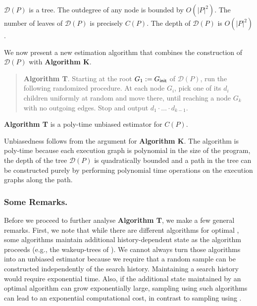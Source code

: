 

\begin{proposition}\label{prop:trust-size}
$\mathcal{D}(P)$ is a tree.
The outdegree of any node is bounded by $O(|P|^2)$.
The number of leaves of $\mathcal{D}(P)$ is precisely $C(P)$.
The depth of $\mathcal{D}(P)$ is $O(|P|^2)$.
\end{proposition}

We now present a new estimation algorithm that combines the construction of $\mathcal{D}(P)$ with \textbf{Algorithm K}.

\begin{verse}
\textbf{Algorithm T}. 
Starting at the root $G_1 := G_{\mathsf{init}}$ of $\mathcal{D}(P)$, run the following
randomized procedure.
At each node $G_i$, pick one of its $d_i$ children
uniformly at random and move there, until reaching a node $G_k$ with
no outgoing edges.
Stop and output $d_1\cdot\ldots\cdot d_{k-1}$.
\end{verse}

\begin{proposition}
\textbf{Algorithm T} is a poly-time unbiased estimator for $C(P)$.
\end{proposition}

Unbiasedness follows from the argument for \textbf{Algorithm K}.
The algorithm is poly-time because each execution graph is polynomial in the size of the program,
the depth of the tree $\mathcal{D}(P)$ is quadratically 
bounded and a path in the tree can be constructed purely by performing polynomial time operations
on the execution graphs along the path.



\subsubsection*{Some Remarks.} Before we proceed to further analyse \textbf{Algorithm T}, we make a few general remarks. First, we note that while there are different algorithms for optimal \dpor,  some algorithms maintain additional history-dependent state as the algorithm proceeds 
(e.g., the wakeup-trees of \cite{optimal-dpor}).
We cannot always turn those algorithms into an unbiased estimator because we require that a random sample can be constructed independently of the search history.
Maintaining a search history would require exponential time.
Also, if the additional state maintained by an optimal \dpor algorithm can grow exponentially large, sampling using such algorithms can lead to an exponential computational cost, in contrast to sampling using \trust. 

